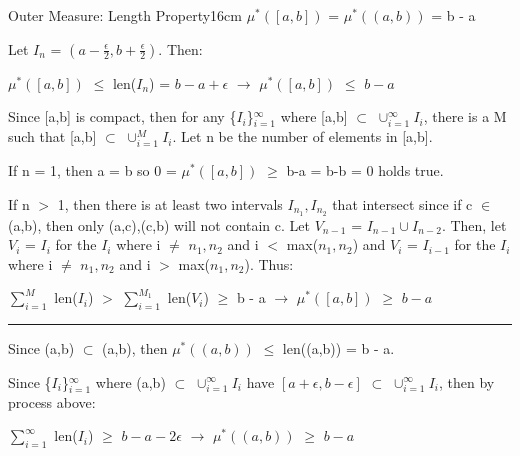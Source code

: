     \begin{wtheorem}{Outer Measure: Length Property}{16cm}
        $\mu^*([a,b])$ = $\mu^*((a,b))$ = b - a
    \end{wtheorem}

    \begin{tbox}
        Let $I_n$ = $(a-\frac{\epsilon}{2} , b+\frac{\epsilon}{2})$. Then:

        \hspace{0.5cm}
        $\mu^*([a,b])$
        $\leq$ len($I_n$)
        = $b - a + \epsilon$
        \hspace{1cm}
        $\rightarrow$
        \hspace{1cm}
        $\mu^*([a,b])$
        $\leq$ $b - a$

        Since [a,b] is compact, then for any \{$I_i$\}$_{i=1}^{\infty}$
        where [a,b] $\subset$ $\cup_{i=1}^{\infty} I_i$, there is a M
        such that [a,b] $\subset$ $\cup_{i=1}^M I_i$.
        Let n be the number of elements in [a,b].

        If n = 1, then a = b so 0 = $\mu^*([a,b])$ $\geq$ b-a = b-b = 0
        holds true.

        If n $>$ 1, then there is at least two intervals $I_{n_1},I_{n_2}$
        that intersect since if c $\in$ (a,b), then only (a,c),(c,b) will
        not contain c.
        Let $V_{n-1}$ = $I_{n-1} \cup I_{n-2}$.
        Then, let $V_i$ = $I_i$ for the $I_i$ where i $\not =$ $n_1,n_2$
        and i $<$ max($n_1,n_2$) and $V_i$ = $I_{i-1}$ for the $I_i$
        where i $\not =$ $n_1,n_2$ and i $>$ max($n_1,n_2$). Thus:

        \hspace{0.5cm}
        $\sum_{i=1}^M$ len($I_i$)
        $>$ $\sum_{i=1}^{M_1}$ len($V_i$)
        $\geq$ b - a
        \hspace{1cm}
        $\rightarrow$
        \hspace{1cm}
        $\mu^*([a,b])$
        $\geq$ $b - a$

        \rule[0.1cm]{15.2cm}{0.01cm}

        Since (a,b) $\subset$ (a,b), then
        $\mu^*((a,b))$ $\leq$ len((a,b)) = b - a.

        Since \{$I_i$\}$_{i=1}^{\infty}$ where (a,b)
        $\subset$ $\cup_{i=1}^{\infty} I_i$ have
        $[a+\epsilon,b-\epsilon]$ $\subset$ $\cup_{i=1}^{\infty} I_i$, then
        by process above:

        \hspace{0.5cm}
        $\sum_{i=1}^{\infty}$ len($I_i$)
        $\geq$ $b - a - 2\epsilon$
        \hspace{1cm}
        $\rightarrow$
        \hspace{1cm}
        $\mu^*((a,b))$
        $\geq$ $b - a$
    \end{tbox}


